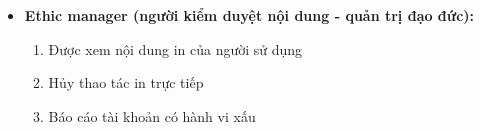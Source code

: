 \begin{itemize}
    \item \textbf{Ethic manager (người kiểm duyệt nội dung - quản trị đạo đức):}
    \begin{enumerate}[- ]
        \item Được xem nội dung in của người sử dụng
        \item Hủy thao tác in trực tiếp
        \item Báo cáo tài khoản có hành vi xấu
    \end{enumerate}

\end{itemize}
